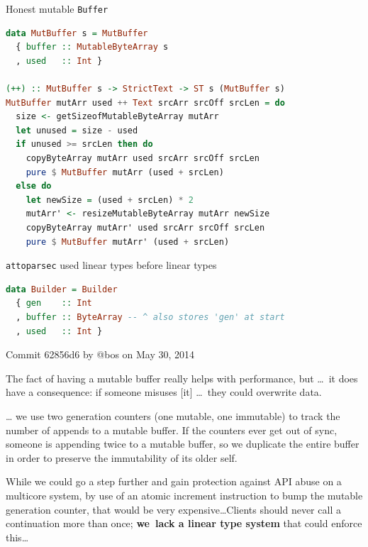 \documentclass[handout]{beamer}
\begin{document}
\begin{frame}[fragile]{Honest mutable {\tt Buffer}}

\begin{lstlisting}[language=Haskell]
data MutBuffer s = MutBuffer
  { buffer :: MutableByteArray s
  , used   :: Int }

(++) :: MutBuffer s -> StrictText -> ST s (MutBuffer s)
MutBuffer mutArr used ++ Text srcArr srcOff srcLen = do
  size <- getSizeofMutableByteArray mutArr
  let unused = size - used
  if unused >= srcLen then do
    copyByteArray mutArr used srcArr srcOff srcLen
    pure $ MutBuffer mutArr (used + srcLen)
  else do
    let newSize = (used + srcLen) * 2
    mutArr' <- resizeMutableByteArray mutArr newSize
    copyByteArray mutArr' used srcArr srcOff srcLen
    pure $ MutBuffer mutArr' (used + srcLen)
\end{lstlisting}

\end{frame}

\begin{frame}[fragile]{{\tt attoparsec} used linear types before linear types}

\vspace{-1.7ex}

\begin{lstlisting}[language=Haskell]
data Builder = Builder
  { gen    :: Int
  , buffer :: ByteArray -- ^ also stores 'gen' at start
  , used   :: Int }
\end{lstlisting}

\vspace{-1.7ex}

\begin{block}{Commit 62856d6 by @bos on May 30, 2014}
\small

The fact of having a mutable buffer really helps with performance,
but \dots\ {it does have a consequence: }if someone misuses [it] \dots\ they could overwrite data.


\dots
we use
two generation counters (one mutable, one immutable) to track the
number of appends to a mutable buffer. If the counters ever get out
of sync, someone is appending twice to a mutable buffer, so we
duplicate the entire buffer in order to preserve the immutability
of its older self.

While we could go a step further and gain protection against API
abuse on a multicore system, by use of an atomic increment
instruction to bump the mutable generation counter, that would be
very expensive\dots Clients should never call a continuation more than
once; {\bf we~lack a linear type system} that could enforce this\dots
\end{block}

\end{frame}
\end{document}
